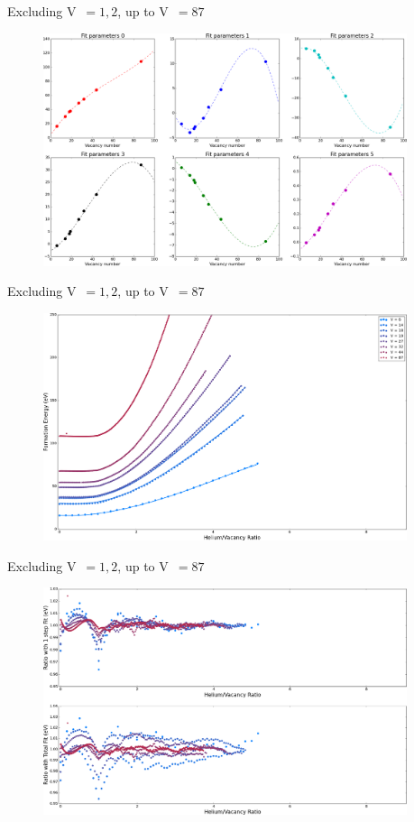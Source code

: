 \documentclass[10pt]{beamer}
\begin{document}
\begin{frame}{Excluding V~$=1, 2$, up to V~$=87$}
	\begin{figure}
        \includegraphics[width=0.95\textwidth]{parameters80}
    \end{figure}
\end{frame}

\begin{frame}{Excluding V~$=1, 2$, up to V~$=87$}
	\begin{figure}
        \includegraphics[width=0.95\textwidth]{energy80}
    \end{figure}
\end{frame}

\begin{frame}{Excluding V~$=1, 2$, up to V~$=87$}
	\begin{figure}
        \includegraphics[width=0.95\textwidth]{ratio80}
    \end{figure}
\end{frame}
\end{document}
